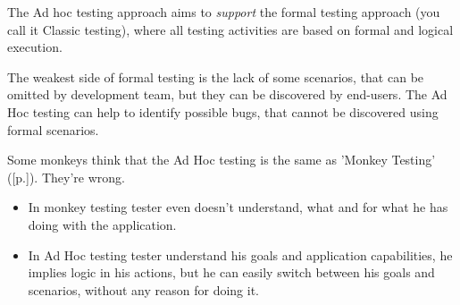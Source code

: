 The Ad hoc testing approach aims to \emph{support} the formal testing approach (you call it Classic testing), where all testing activities are based on formal and logical execution.

The weakest side of formal testing is the lack of some scenarios, that can be omitted by development team, but they can be discovered by end-users. The Ad Hoc testing can help to identify possible bugs, that cannot be discovered using formal scenarios.

Some monkeys think that the Ad Hoc testing is the same as 'Monkey Testing' ([p.\pageref{sec:Monkey Testing}]). They're wrong.

\begin{itemize}
\item {In monkey testing tester even doesn't understand, what and for what he has doing with the application.}

\item {In Ad Hoc testing tester understand his goals and application capabilities, he implies logic in his actions, but he can easily switch between his goals and scenarios, without any reason for doing it.}
\end{itemize}
